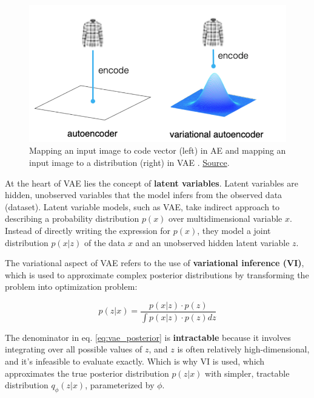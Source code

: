 \begin{figure}[h]
    \centering
    \includegraphics[scale=0.4]{images/autoencoder-vs-variational-autoencoder-point-vs-distribution-768x409.png}
    \caption{Mapping an input image to code vector (left) in AE and mapping an input image to a distribution (right) in VAE \cite{ae_vs_vae}. \href{https://vitalflux.com/autoencoder-vs-variational-autoencoder-vae-difference/}{Source}.}
    \label{fig:ae_vs_vae}
\end{figure}

At the heart of VAE lies the concept of \textbf{latent variables}. Latent variables are hidden, unobserved variables that the model infers from the observed data (dataset). Latent variable models, such as VAE, take indirect approach to describing a probability distribution $p(x)$ over multidimensional variable $x$. Instead of directly writing the expression for $p(x)$, they model a joint distribution $p(x|z)$ of the data $x$ and an unobserved hidden latent variable $z$.

The variational aspect of VAE refers to the use of \textbf{variational inference (VI)}, which is used to approximate complex posterior distributions by transforming the problem into optimization problem:

\begin{equation}
p(z|x) = \frac{p(x|z) \cdot p(z)}{\int p(x|z) \cdot p(z) dz}
\label{eq:vae_posterior}
\end{equation}

The denominator in eq. \ref{eq:vae_posterior} is \textbf{intractable} because it involves integrating over all possible values of $z$, and $z$ is often relatively high-dimensional, and it's infeasible to evaluate exactly. Which is why VI is used, which approximates the true posterior distribution $p(z|x)$ with simpler, tractable distribution $q_\phi (z|x)$, parameterized by $\phi$.

